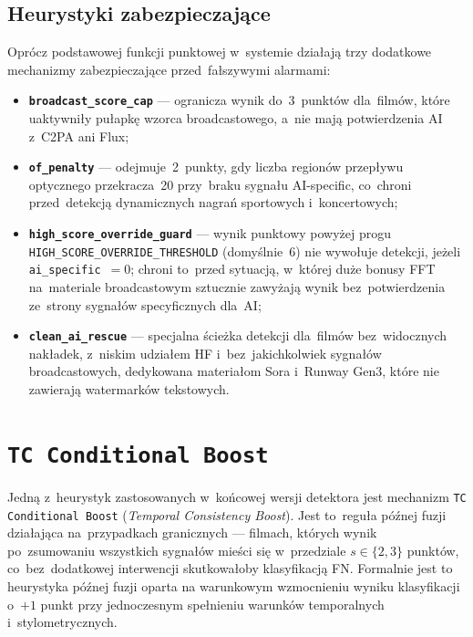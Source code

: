 \subsection*{Heurystyki zabezpieczające}

Oprócz podstawowej funkcji punktowej w~systemie działają trzy
dodatkowe mechanizmy zabezpieczające przed~fałszywymi alarmami:

\begin{itemize}
  \item \textbf{\texttt{broadcast\_score\_cap}} --- ogranicza wynik do~3~punktów
    dla~filmów, które uaktywniły pułapkę wzorca broadcastowego,
    a~nie mają potwierdzenia AI z~C2PA ani Flux;
  \item \textbf{\texttt{of\_penalty}} --- odejmuje~2~punkty, gdy liczba regionów
    przepływu optycznego przekracza~20 przy~braku sygnału AI-specific,
    co~chroni przed~detekcją dynamicznych nagrań sportowych i~koncertowych;
  \item \textbf{\texttt{high\_score\_override\_guard}} --- wynik punktowy powyżej progu
    \texttt{HIGH\_SCORE\_OVERRIDE\_THRESHOLD} (domyślnie~6) nie wywołuje
    detekcji, jeżeli \texttt{ai\_specific}~$= 0$; chroni to~przed sytuacją,
    w~której duże bonusy FFT na~materiale broadcastowym sztucznie zawyżają
    wynik bez~potwierdzenia ze~strony sygnałów specyficznych dla~AI;
  \item \textbf{\texttt{clean\_ai\_rescue}} --- specjalna ścieżka detekcji dla~filmów
    bez~widocznych nakładek, z~niskim udziałem HF i~bez~jakichkolwiek
    sygnałów broadcastowych, dedykowana materiałom Sora i~Runway Gen3,
    które nie zawierają watermarków tekstowych.
\end{itemize}

\section{\texttt{TC Conditional Boost}}
\label{sec:tc_boost}

Jedną z~heurystyk zastosowanych w~końcowej wersji detektora jest mechanizm
\texttt{TC Conditional Boost} (\textit{Temporal Consistency Boost}). Jest to~reguła
późnej fuzji działająca na~przypadkach granicznych --- filmach, których
wynik po~zsumowaniu wszystkich sygnałów mieści się w~przedziale $s \in \{2, 3\}$
punktów, co~bez~dodatkowej interwencji skutkowałoby klasyfikacją FN.
Formalnie jest to heurystyka późnej fuzji oparta na warunkowym
wzmocnieniu wyniku klasyfikacji o~$+1$ punkt przy jednoczesnym spełnieniu
warunków temporalnych i~stylometrycznych.

